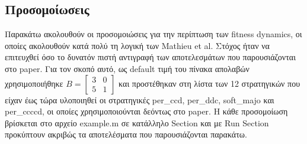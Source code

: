 \documentclass[12pt]{article}
\begin{document}
\subsection{Προσομοίωσεις}
Παρακάτω ακολουθούν οι προσομοιώσεις για την περίπτωση των fitness dynamics, οι οποίες ακολουθούν κατά πολύ τη λογική των Mathieu et al. Στόχος ήταν να επιτευχθεί όσο το δυνατόν πιστή αντιγραφή των αποτελεσμάτων που παρουσιάζονται στο paper. Για τον σκοπό αυτό, ως default τιμή του πίνακα απολαβών χρησιμοποιήθηκε $B = \begin{bmatrix} 3 & 0 \\5 & 1 \end{bmatrix}$ και προστέθηκαν στη λίστα των 12 στρατηγικών που είχαν έως τώρα υλοποιηθεί οι στρατηγικές per\_ccd, per\_ddc, soft\_majo και per\_ccccd, οι οποίες χρησιμοποιούνται δεόντως στο paper. Η κάθε προσομοίωση βρίσκεται στο αρχείο example.m σε κατάλληλο Section και με Run Section προκύπτουν ακριβώς τα αποτελέσματα που παρουσιάζονται παρακάτω.
\end{document}
